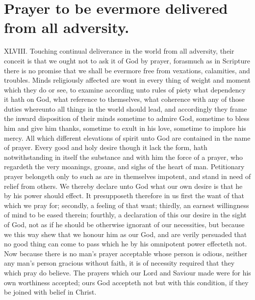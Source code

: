 \section*{Prayer to be evermore delivered from all adversity.}
XLVIII. Touching continual deliverance in the world from all adversity, their conceit is that we ought not to ask it of God by prayer, forasmuch as in Scripture there is no promise that we shall be evermore free from vexations, calamities, and troubles.
Minds religiously affected are wont in every thing of weight and moment which they do or see, to examine according unto rules of piety what dependency it hath on God, what reference to themselves, what coherence with any of those duties whereunto all things in the world should lead, and accordingly they frame the inward disposition of their minds sometime to admire God, sometime to bless him and give him thanks, sometime to exult in his love, sometime to implore his mercy. All which different elevations of spirit unto God are contained in the name of prayer. Every good and holy desire though it lack the form, hath notwithstanding in itself the substance and with him the force of a prayer, who regardeth the very moanings, groans, and sighs of the heart of man. Petitionary prayer belongeth only to such as are in themselves impotent, and stand in need of relief from others. We thereby declare unto God what our own desire is that he by his power should effect. It presupposeth therefore in us first the want of that which we pray for; secondly, a feeling of that want; thirdly, an earnest willingness of mind to be eased therein; fourthly, a declaration of this our desire in the sight of God, not as if he should be otherwise ignorant of our necessities, but because we this way shew that we honour him as our God, and are verily persuaded that no good thing can come to pass which he by his omnipotent power effecteth not.
Now because there is no man’s prayer acceptable whose person is odious, neither any man’s person gracious without faith, it is of necessity required that they which pray do believe. The prayers which our Lord and Saviour made were for his own worthiness accepted; ours God accepteth not but with this condition, if they be joined with belief in Christ.
